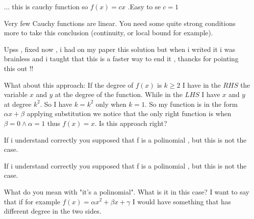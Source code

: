 \begin{solution}
	\begin{tcolorbox}... this is cauchy function so $f(x) = cx$ .Easy to se $c = 1$\end{tcolorbox}
Very few Cauchy functions are linear. You need some quite strong conditions more to take this conclusion (continuity, or local bound for example).



\end{solution}



\begin{solution}
	Upss , fixed now ,  i had on my paper this solution but when i writed it i was brainless and i taught that this is a faster way to end it , thancks for pointing this out !!
\end{solution}



\begin{solution}
	What about this approach:
If the degree of \(f(x)\) is \(k\ge 2\) I have in the \(RHS\) the variable \(x\) and \(y\) at the degree of the function. While in the \(LHS\) I have \(x\) and \(y\) at degree \(k^2\). So I have \(k=k^2\) only when \(k=1\). So my function is in the form \(\alpha x+\beta\) applying substitution we notice that the only right function is when \(\beta=0 \land \alpha=1\) thus \(f(x)=x\).
Is this approach right?
\end{solution}



\begin{solution}
	If i understand correctly you supposed that f is a polinomial , but this is not the case.
\end{solution}



\begin{solution}
	\begin{tcolorbox}If i understand correctly you supposed that f is a polinomial , but this is not the case.\end{tcolorbox}

What do you mean with "it's a polinomial". What is it in this case? I want to say that if for example \(f(x)=\alpha x^2 + \beta x + \gamma\) I would have something that has different degree in the two sides.
\end{solution}



